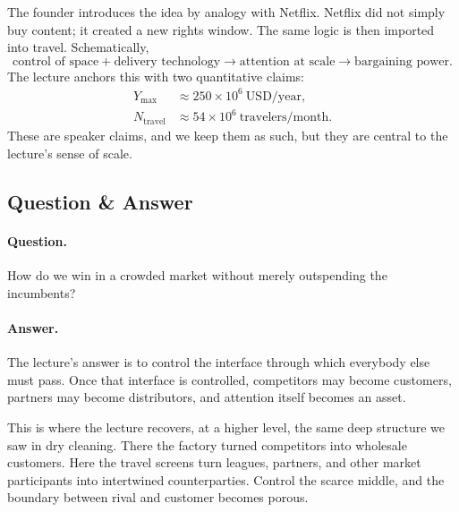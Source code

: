 The founder introduces the idea by analogy with Netflix. Netflix did not simply buy content; it created a new rights window. The same logic is then imported into travel. Schematically,
\begin{equation}
\text{control of space} + \text{delivery technology} \longrightarrow \text{attention at scale} \longrightarrow \text{bargaining power}.
\end{equation}
The lecture anchors this with two quantitative claims:
\begin{align}
Y_{\max} &\approx 250\times 10^6\ \text{USD/year}, \\
N_{\text{travel}} &\approx 54\times 10^6\ \text{travelers/month}.
\end{align}
These are speaker claims, and we keep them as such, but they are central to the lecture's sense of scale.

\begin{figure}[h]
\centering
{}
\end{figure}

\subsection{Question \& Answer}

\paragraph{Question.} How do we win in a crowded market without merely outspending the incumbents?

\paragraph{Answer.} The lecture's answer is to control the interface through which everybody else must pass. Once that interface is controlled, competitors may become customers, partners may become distributors, and attention itself becomes an asset.

This is where the lecture recovers, at a higher level, the same deep structure we saw in dry cleaning. There the factory turned competitors into wholesale customers. Here the travel screens turn leagues, partners, and other market participants into intertwined counterparties. Control the scarce middle, and the boundary between rival and customer becomes porous.

